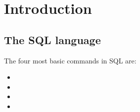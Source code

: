 %
%
%
\section{Introduction}

\subsection{The SQL language}

The four most basic commands in SQL are:

\begin{itemize}
    \item 
    \item 
    \item 
    \item 
\end{itemize}


